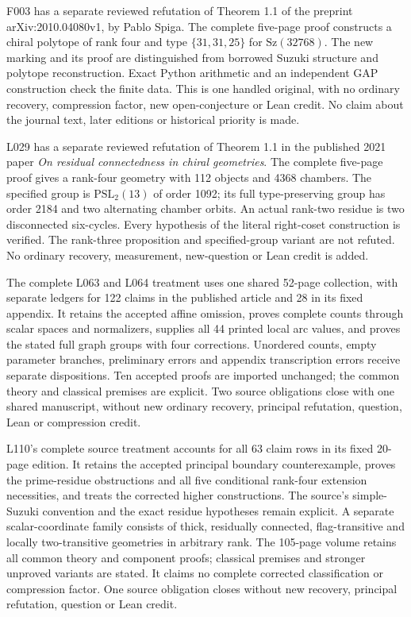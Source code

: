 \documentclass[11pt,a4paper]{article}
\begin{document}
F003 has a separate reviewed refutation of Theorem 1.1 of the preprint
arXiv:2010.04080v1, by Pablo Spiga. The complete five-page proof constructs a
chiral polytope of rank four and type $\{31,31,25\}$ for $\mathrm{Sz}(32768)$.
The new marking and its proof are distinguished from borrowed Suzuki structure
and polytope reconstruction. Exact Python arithmetic and an independent GAP
construction check the finite data. This is one handled original, with no
ordinary recovery, compression factor, new open-conjecture or Lean credit.
No claim about the journal text, later editions or historical priority is made.

L029 has a separate reviewed refutation of Theorem 1.1 in the published
2021 paper \emph{On residual connectedness in chiral geometries}. The
complete five-page proof gives a rank-four geometry with 112 objects and
4368 chambers. The specified group is $\mathrm{PSL}_2(13)$ of order 1092;
its full type-preserving group has order 2184 and two alternating chamber
orbits. An actual rank-two residue is two disconnected six-cycles. Every
hypothesis of the literal right-coset construction is verified. The
rank-three proposition and specified-group variant are not refuted. No
ordinary recovery, measurement, new-question or Lean credit is added.

The complete L063 and L064 treatment uses one shared 52-page collection,
with separate ledgers for 122 claims in the published article and 28 in its
fixed appendix. It retains the accepted affine omission, proves complete
counts through scalar spaces and normalizers, supplies all 44 printed local
arc values, and proves the stated full graph groups with four corrections.
Unordered counts, empty parameter branches, preliminary errors and appendix
transcription errors receive separate dispositions. Ten accepted proofs are
imported unchanged; the common theory and classical premises are explicit.
Two source obligations close with one shared manuscript, without new ordinary
recovery, principal refutation, question, Lean or compression credit.

L110's complete source treatment accounts for all 63 claim rows in its fixed
20-page edition. It retains the accepted principal boundary counterexample,
proves the prime-residue obstructions and all five conditional rank-four
extension necessities, and treats the corrected higher constructions. The
source's simple-Suzuki convention and the exact residue hypotheses remain
explicit. A separate scalar-coordinate family consists of thick, residually
connected, flag-transitive and locally two-transitive geometries in arbitrary
rank. The 105-page volume retains all common theory and component proofs;
classical premises and stronger unproved variants are stated. It claims no
complete corrected classification or compression factor. One source obligation
closes without new recovery, principal refutation, question or Lean credit.
\end{document}
